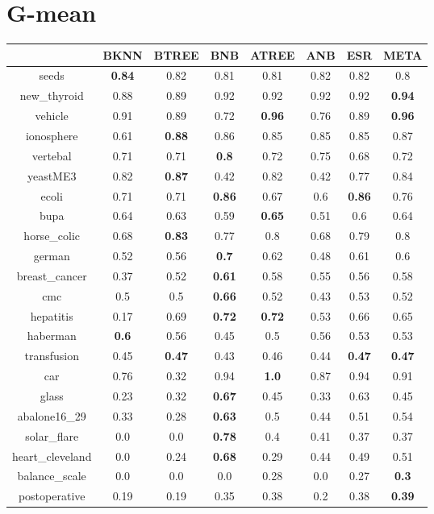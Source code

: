 \documentclass{article}%
\begin{document}
\section*{G{-}mean}%
\begin{tabular}{c|ccccccc}%
\hline%
&BKNN&BTREE&BNB&ATREE&ANB&ESR&META\\%
\hline%
seeds&\textbf{0.84}&0.82&0.81&0.81&0.82&0.82&0.8\\%
new\_thyroid&0.88&0.89&0.92&0.92&0.92&0.92&\textbf{0.94}\\%
vehicle&0.91&0.89&0.72&\textbf{0.96}&0.76&0.89&\textbf{0.96}\\%
ionosphere&0.61&\textbf{0.88}&0.86&0.85&0.85&0.85&0.87\\%
vertebal&0.71&0.71&\textbf{0.8}&0.72&0.75&0.68&0.72\\%
yeastME3&0.82&\textbf{0.87}&0.42&0.82&0.42&0.77&0.84\\%
ecoli&0.71&0.71&\textbf{0.86}&0.67&0.6&\textbf{0.86}&0.76\\%
bupa&0.64&0.63&0.59&\textbf{0.65}&0.51&0.6&0.64\\%
horse\_colic&0.68&\textbf{0.83}&0.77&0.8&0.68&0.79&0.8\\%
german&0.52&0.56&\textbf{0.7}&0.62&0.48&0.61&0.6\\%
breast\_cancer&0.37&0.52&\textbf{0.61}&0.58&0.55&0.56&0.58\\%
cmc&0.5&0.5&\textbf{0.66}&0.52&0.43&0.53&0.52\\%
hepatitis&0.17&0.69&\textbf{0.72}&\textbf{0.72}&0.53&0.66&0.65\\%
haberman&\textbf{0.6}&0.56&0.45&0.5&0.56&0.53&0.53\\%
transfusion&0.45&\textbf{0.47}&0.43&0.46&0.44&\textbf{0.47}&\textbf{0.47}\\%
car&0.76&0.32&0.94&\textbf{1.0}&0.87&0.94&0.91\\%
glass&0.23&0.32&\textbf{0.67}&0.45&0.33&0.63&0.45\\%
abalone16\_29&0.33&0.28&\textbf{0.63}&0.5&0.44&0.51&0.54\\%
solar\_flare&0.0&0.0&\textbf{0.78}&0.4&0.41&0.37&0.37\\%
heart\_cleveland&0.0&0.24&\textbf{0.68}&0.29&0.44&0.49&0.51\\%
balance\_scale&0.0&0.0&0.0&0.28&0.0&0.27&\textbf{0.3}\\%
postoperative&0.19&0.19&0.35&0.38&0.2&0.38&\textbf{0.39}\\%
\end{tabular}

%
\end{document}
